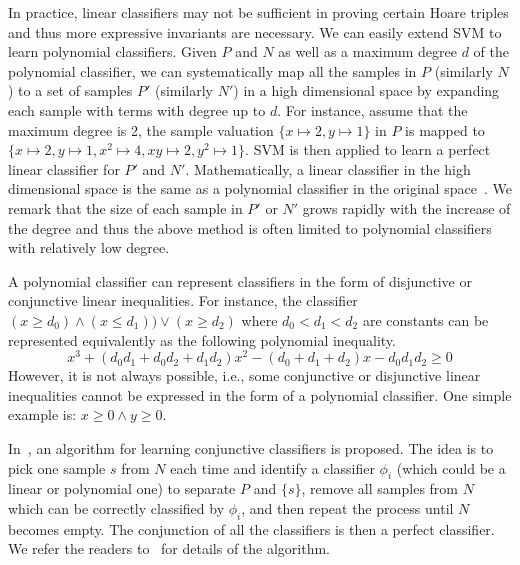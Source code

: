 In practice, linear classifiers may not be sufficient in proving certain Hoare triples and thus more expressive invariants are necessary. We can easily extend SVM to learn polynomial classifiers. Given $P$ and $N$ as well as a maximum degree $d$ of the polynomial classifier, we can systematically map all the samples in $P$ (similarly $N$) to a set of samples $P'$ (similarly $N'$) in a high dimensional space by expanding each sample with terms with degree up to $d$. For instance, assume that the maximum degree is 2, the sample valuation $\{ x \mapsto 2, y \mapsto 1\}$ in $P$ is mapped to $\{x \mapsto 2, y \mapsto 1, x^2 \mapsto 4, xy \mapsto 2, y^2 \mapsto 1\}$.
SVM is then applied to learn a perfect linear classifier for $P'$ and $N'$. Mathematically, a linear classifier in the high dimensional space is the same as a polynomial classifier in the original space~\cite{svm:kernel}.
We remark that the size of each sample in $P'$ or $N'$ grows rapidly with the increase of the degree and thus the above method is often limited to polynomial classifiers with relatively low degree.

A polynomial classifier can represent classifiers in the form of disjunctive or conjunctive linear inequalities. For instance, the classifier $(x \ge d_0) \wedge (x \le d_1)\big) \vee (x \ge d_2)$
where $d_0 < d_1 < d_2$ are constants can be represented equivalently as the following polynomial inequality.
\[
x^3 + (d_0d_1 + d_0d_2 + d_1d_2)x^2 - (d_0 + d_1 + d_2)x - d_0d_1d_2 \geq 0
\]
However, it is not always possible, i.e., some conjunctive or disjunctive linear inequalities cannot be expressed in the form of a polynomial classifier. One simple example is: $x \ge 0 \land y \ge 0$.

In~\cite{sharma2012interpolants}, an algorithm for learning conjunctive classifiers is proposed. The idea is to pick one sample $s$ from $N$ each time and identify a classifier $\phi_i$ (which could be a linear or polynomial one) to separate $P$ and $\{s\}$, remove all samples from $N$ which can be correctly classified by $\phi_i$, and then repeat the process until $N$ becomes empty. The conjunction of all the classifiers is then a perfect classifier. We refer the readers to~\cite{sharma2012interpolants} for details of the algorithm. %

